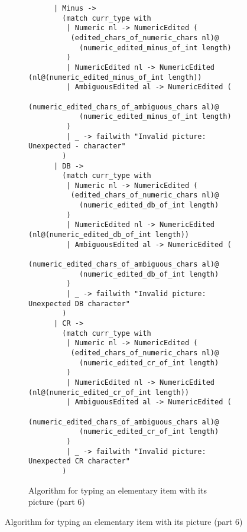 \documentclass[a4paper,10pt]{article}
\begin{document}
\begin{figure}[!ht]
  \ContinuedFloat
  \begin{subfigure}{1.05\textwidth}
    \begin{verbatim}
      | Minus ->
        (match curr_type with
         | Numeric nl -> NumericEdited (
          (edited_chars_of_numeric_chars nl)@
            (numeric_edited_minus_of_int length)
         )
         | NumericEdited nl -> NumericEdited (nl@(numeric_edited_minus_of_int length))
         | AmbiguousEdited al -> NumericEdited (
          (numeric_edited_chars_of_ambiguous_chars al)@
            (numeric_edited_minus_of_int length)
         )
         | _ -> failwith "Invalid picture: Unexpected - character"
        )
      | DB ->
        (match curr_type with
         | Numeric nl -> NumericEdited (
          (edited_chars_of_numeric_chars nl)@
            (numeric_edited_db_of_int length)
         )
         | NumericEdited nl -> NumericEdited (nl@(numeric_edited_db_of_int length))
         | AmbiguousEdited al -> NumericEdited (
          (numeric_edited_chars_of_ambiguous_chars al)@
            (numeric_edited_db_of_int length)
         )
         | _ -> failwith "Invalid picture: Unexpected DB character"
        )
      | CR ->
        (match curr_type with
         | Numeric nl -> NumericEdited (
          (edited_chars_of_numeric_chars nl)@
            (numeric_edited_cr_of_int length)
         )
         | NumericEdited nl -> NumericEdited (nl@(numeric_edited_cr_of_int length))
         | AmbiguousEdited al -> NumericEdited (
          (numeric_edited_chars_of_ambiguous_chars al)@
            (numeric_edited_cr_of_int length)
         )
         | _ -> failwith "Invalid picture: Unexpected CR character"
        )
    \end{verbatim}
    \caption{Algorithm for typing an elementary item with its picture (part 6)}
    \label{fig:algo_typ_elem_pic_6}
  \end{subfigure}
\end{figure}
\end{document}
